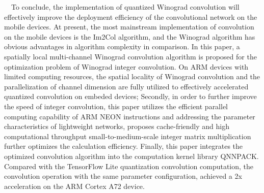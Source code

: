 \begin{abstract*}
  To conclude,  the implementation of quantized Winograd convolution will effectively improve the deployment efficiency of the convolutional network on the mobile devices. At present, the most mainstream implementation of convolution on the mobile devices is the Im2Col algorithm, and the Winograd algorithm has obvious advantages in algorithm complexity in comparison. In this paper, a spatially local multi-channel Winograd convolution algorithm is proposed for the optimization problem of Winograd integer convolution. On ARM devices with limited computing resources, the spatial locality of Winograd convolution and the parallelization of channel dimension are fully utilized to
effectively accelerated quantized convolution on embeded devices; Secondly, in order to further improve the speed of integer convolution, this paper utilizes the efficient parallel computing capability of ARM NEON instructions and
addressing the parameter characteristics of lightweight networks, proposes cache-friendly and high computational throughput small-to-medium-scale integer matrix multiplication further optimizes the calculation efficiency. Finally, this paper integrates the optimized convolution algorithm into the computation kernel library QNNPACK. Compared with the TensorFlow Lite quantization convolution computation, the convolution operation with the same parameter configuration, achieved a 2x acceleration on the ARM Cortex A72 device.
\end{abstract*}
